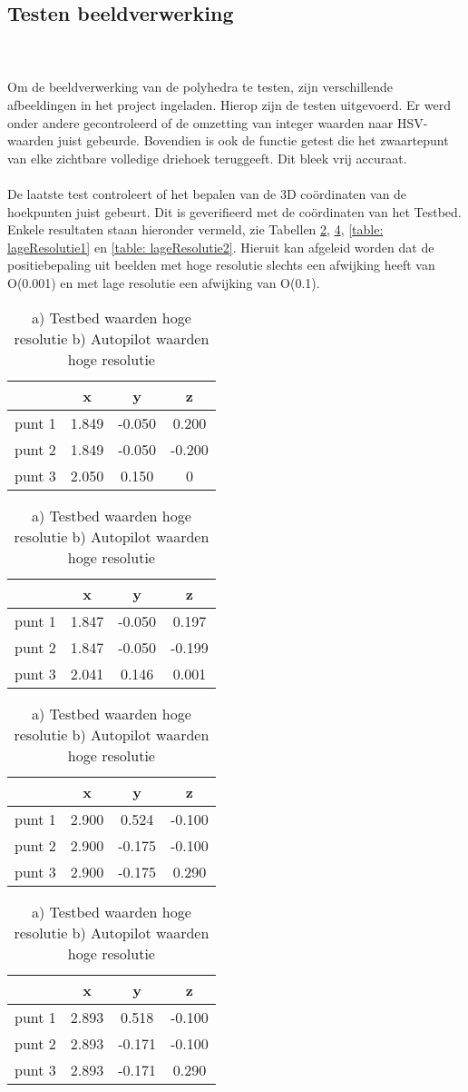 \subsection{Testen beeldverwerking}
\\\\
Om de beeldverwerking van de polyhedra te testen, zijn verschillende afbeeldingen in het project ingeladen. Hierop zijn de testen uitgevoerd. Er werd onder andere gecontroleerd of de omzetting van integer waarden naar HSV-waarden juist gebeurde. Bovendien is ook de functie getest die het zwaartepunt van elke zichtbare volledige driehoek teruggeeft. Dit bleek vrij accuraat.
\\\\
De laatste test controleert of het bepalen van de 3D co\"ordinaten van de hoekpunten juist gebeurt. Dit is geverifieerd met de co\"ordinaten van het Testbed. Enkele resultaten staan hieronder vermeld, zie Tabellen \ref{table: hogeResolutie1}, \ref{table: hogeResolutie2}, \ref{table: lageResolutie1} en \ref{table: lageResolutie2}. Hieruit kan afgeleid worden dat de positiebepaling uit beelden met hoge resolutie slechts een afwijking heeft van O(0.001) en met lage resolutie een afwijking van O(0.1).
\begin{table}[!h]
	\centering
	\begin{tabular}{l|c|c|c}
		& x & y & z \\ \hline
		punt 1 & 1.849 & -0.050 & 0.200 \\
		punt 2 & 1.849 & -0.050 & -0.200 \\
		punt 3 & 2.050 & 0.150 & 0
	\end{tabular}
	\begin{tabular}{l|c|c|c}
		& x & y & z \\ \hline
		punt 1 & 1.847 & -0.050 & 0.197 \\
		punt 2 & 1.847 & -0.050 & -0.199 \\
		punt 3 & 2.041 & 0.146 & 0.001
	\end{tabular}
\caption{a) Testbed waarden hoge resolutie  b) Autopilot waarden hoge resolutie}
\label{table: hogeResolutie1}
\end{table}
\begin{table}[!h]
	\centering
	\begin{tabular}{l|c|c|c}
		& x & y & z \\ \hline
		punt 1 & 2.900 & 0.524 & -0.100 \\
		punt 2 & 2.900 & -0.175 & -0.100 \\
		punt 3 & 2.900 & -0.175 & 0.290
	\end{tabular}
	\begin{tabular}{l|c|c|c}
		& x & y & z \\ \hline
		punt 1 & 2.893 & 0.518 & -0.100 \\
		punt 2 & 2.893 & -0.171 & -0.100 \\
		punt 3 & 2.893 & -0.171 & 0.290
	\end{tabular}
\caption{a) Testbed waarden hoge resolutie  b) Autopilot waarden hoge resolutie}
\label{table: hogeResolutie2}
\end{table}
